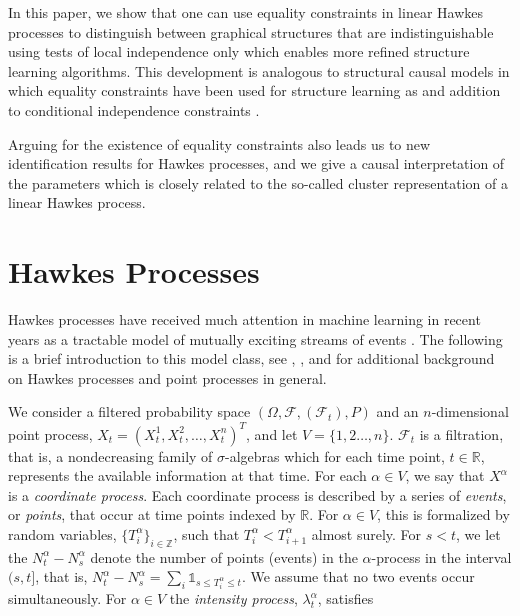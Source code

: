 \documentclass[accepted]{uai2021} %
\begin{document}
In this paper, we show that one can 
use equality 
constraints in linear Hawkes processes to distinguish between graphical 
structures that 
are indistinguishable using tests of local independence only which enables more 
refined structure learning algorithms. This development 
is analogous to structural causal models in which equality constraints have 
been used for structure learning as and addition to conditional independence 
constraints 
\citep{robins1986,vermaEquiAndSynthesis,robins1999,tian2002,shpitser2014,richardson2017}.

Arguing for the existence of equality constraints also leads us to new 
identification 
results for Hawkes processes, 
and we give a causal interpretation of the parameters which is closely 
related to the so-called cluster representation of a linear Hawkes process.




\section{Hawkes Processes}
\label{sec:hawPro}

Hawkes processes have received much attention in machine learning in recent 
years as a tractable model of mutually exciting streams of events 
\citep{zhou2013, zhou2013b,luo2015,etesami2016,tan2018,xu2018,trouleau2019}. 
The following is a brief introduction to this model class,
see \cite{laubHawkes2015}, \cite{linigerThesis}, and \cite{daleyVere} for 
additional background on Hawkes processes and point processes in general.

We consider a filtered probability space $(\Omega, \mathcal{F}, 
(\mathcal{F}_t), P)$ and an $n$-dimensional point process, $X_t = 
(X_t^1,X_t^2,\ldots,X_t^n)^T$, and let $V= \{1,2\ldots, n\}$. $\mathcal{F}_t$ 
is 
a filtration, that is, a nondecreasing family of $\sigma$-algebras which for 
each time point, $t\in \mathbb{R}$, represents the available information at 
that time. For each 
$\alpha\in 
V$, we say that $X^\alpha$ is a \emph{coordinate process}. Each coordinate 
process is described by a series of \emph{events}, or \emph{points}, that occur 
at time points indexed by $\mathbb{R}$. For $\alpha \in V$, this is formalized 
by random variables, $\{T_i^\alpha\}_{i\in\mathbb{Z}}$, such 
that $T_i^\alpha < T_{i+1}^\alpha$ almost surely. For $s<t$, we let the  
$N_t^\alpha - 
N_s^\alpha$ denote the number of points (events) in the $\alpha$-process 
in the interval $(s,t]$, that is,  $N_t^\alpha - 
N_s^\alpha= \sum_i \mathds{1}_{s \leq T_i^\alpha \leq t}$. We 
assume that no 
two events occur simultaneously. For 
$\alpha\in V$ the \emph{intensity process}, $\lambda_t^\alpha$, 
satisfies
\end{document}
